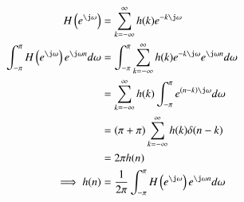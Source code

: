 \documentclass[journal,12pt,twocolumn]{IEEEtran}
\renewcommand\thesection{\arabic{section}}
\begin{document}
\begin{enumerate}[label=\thesection.\arabic*]
\solution 
\begin{align}
    H\brak{e^{\j \omega}}&= \sum_{k=-\infty}^{\infty} h(k) e^{-k\j \omega}\\
    \int_{-\pi}^{\pi}H\brak{e^{\j \omega}}e^{\j\omega n}d\omega&= \int_{-\pi}^{\pi}\sum_{k=-\infty}^{\infty} h(k) e^{-k\j \omega}e^{\j\omega n}d\omega\\
    &= \sum_{k=-\infty}^{\infty}h(k)\int_{-\pi}^{\pi}e^{\brak{n-k}\j  \omega}d\omega\\
    &=(\pi+\pi)\sum_{k=-\infty}^{\infty}h(k)\delta(n-k)\\
    &= 2\pi h(n)\\
    \implies h(n) &= \frac{1}{2\pi}\int_{-\pi}^{\pi}H\brak{e^{\j \omega}}e^{\j\omega n}d\omega
\end{align}
\end{enumerate}


\newcommand\showdiv[1]{\overline{\smash{\hstretch{0.5}{)}\mkern-3.2mu\hstretch{0.5}{)}}#1}}
\end{document}
